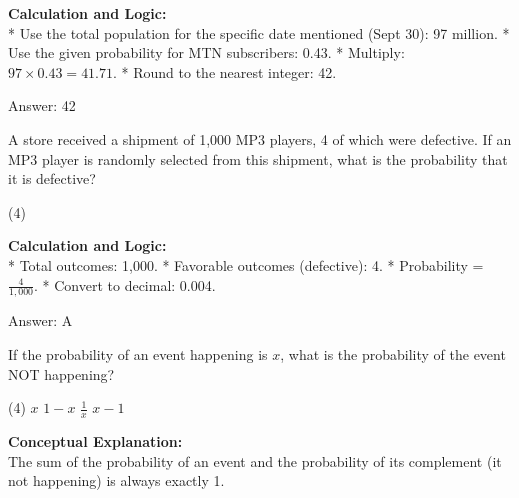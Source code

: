 \documentclass[11pt,paper=a4,answers]{exam}
\begin{document}
\begin{questions}
\begin{solution}
\vspace{30pt}

\textbf{Calculation and Logic:} \\
* Use the total population for the specific date mentioned (Sept 30): 97 million.
* Use the given probability for MTN subscribers: 0.43.
* Multiply: $97 \times 0.43 = 41.71$.
* Round to the nearest integer: 42.

\vspace{30pt}

Answer: \colorbox{yellow!100}{42}
\end{solution}

\vspace{60pt}

\question
A store received a shipment of 1,000 MP3 players, 4 of which were defective. If an MP3 player is randomly selected from this shipment, what is the probability that it is defective?
\begin{tasks}(4)
\end{tasks}

\begin{solution}
\textbf{Calculation and Logic:} \\
* Total outcomes: 1,000.
* Favorable outcomes (defective): 4.
* Probability = $\frac{4}{1,000}$.
* Convert to decimal: 0.004.

\vspace{30pt}

Answer: \colorbox{yellow!100}{A}
\end{solution}

\vspace{60pt}

\question
If the probability of an event happening is $x$, what is the probability of the event NOT happening?
\begin{tasks}(4)
    \task $x$
    \task $1 - x$
    \task $\frac{1}{x}$
    \task $x - 1$
\end{tasks}

\begin{solution}
\textbf{Conceptual Explanation:} \\
The sum of the probability of an event and the probability of its complement (it not happening) is always exactly 1.

\vspace{30pt}


\end{solution}
\end{questions}
\end{document}
